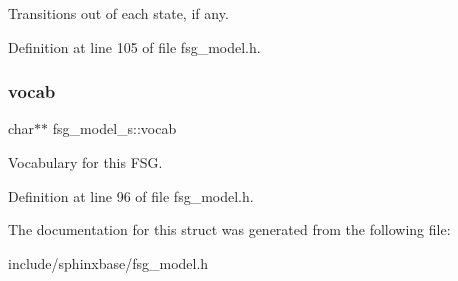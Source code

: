 Transitions out of each state, if any. 



Definition at line 105 of file fsg\+\_\+model.\+h.

\mbox{\label{structfsg__model__s_a6bbfce2d672624d792ff964200a64031}} 
\subsubsection{vocab}
{\footnotesize\ttfamily char$\ast$$\ast$ fsg\+\_\+model\+\_\+s\+::vocab}



Vocabulary for this F\+SG. 



Definition at line 96 of file fsg\+\_\+model.\+h.



The documentation for this struct was generated from the following file\+:\begin{DoxyCompactItemize}
\item 
include/sphinxbase/fsg\+\_\+model.\+h\end{DoxyCompactItemize}
